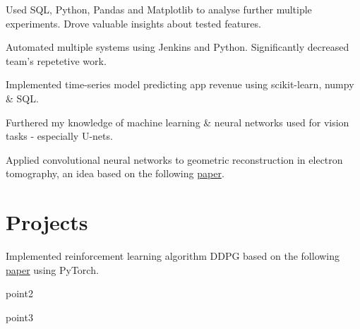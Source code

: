 \documentclass[]{CV}
\begin{document}
\begin{minipage}[t]{0.70\textwidth}
\begin{tightemize}
\item Used SQL, Python, Pandas and Matplotlib to analyse further multiple experiments. Drove valuable insights about tested features.

\item Automated multiple systems using Jenkins and Python. Significantly decreased team's repetetive work.

\item Implemented time-series model predicting app revenue using scikit-learn, numpy \& SQL.

\end{tightemize}
\sectionsep

\vspace{\topsep} %
\begin{tightemize}
\sectionsep
\item Furthered my knowledge of machine learning \& neural networks used for vision tasks - especially U-nets.

\item  Applied convolutional neural networks to geometric reconstruction in electron tomography, an idea based on the following {\href{https://core.ac.uk/download/pdf/204935374.pdf}{paper}}.

\end{tightemize}
\sectionsep



\section{Projects}

\begin{tightemize}

\item Implemented reinforcement learning algorithm DDPG based on the following {\href{https://arxiv.org/abs/1509.0297[]}{paper}} using PyTorch.

\item point2

\item point3



\end{tightemize}
\end{minipage}
\end{document}

